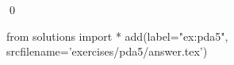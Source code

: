 
\begin{ex} 
  \label{ex:pda5}
  
  \qed
\end{ex} 
\begin{python0}
from solutions import *
add(label="ex:pda5",
    srcfilename='exercises/pda5/answer.tex') 
\end{python0}
